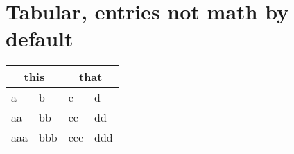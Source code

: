


\section{Tabular, entries not math by default}

\begin{center}
\begin{tabular}{|ll|ll|}
\hline 
\multicolumn{2}{|c}{this} & \multicolumn{2}{|c|}{that} \\ \hline
a & b & c & d \\ 
aa & bb & cc & dd \\ 
aaa & bbb & ccc & ddd \\ \hline
\end{tabular}
\end{center}